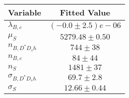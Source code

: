 \begin{tabular}[t]{lc}
\hline
Variable &Fitted Value\\
\hline\hline
$\lambda_{B,c}$&$(-0.0\pm2.5)e-06$\\
\hline
$\mu_S$&$5279.48\pm0.50$\\
\hline
$n_{B, D^* D_s h}$&$744\pm38$\\
\hline
$n_{B,c}$&$84\pm44$\\
\hline
$n_S$&$1481\pm37$\\
\hline
$\sigma_{B, D^* D_s h}$&$69.7\pm2.8$\\
\hline
$\sigma_S$&$12.66\pm0.44$\\
\hline
\end{tabular}